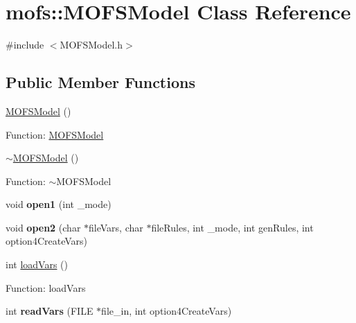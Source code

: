 \hypertarget{classmofs_1_1MOFSModel}{\section{mofs\-:\-:M\-O\-F\-S\-Model Class Reference}
\label{classmofs_1_1MOFSModel}
}


{\ttfamily \#include $<$M\-O\-F\-S\-Model.\-h$>$}

\subsection*{Public Member Functions}
\begin{DoxyCompactItemize}
\item 
\hyperlink{classmofs_1_1MOFSModel_a2bdf10a9c3bb27aa53f979ac5d4dc558}{M\-O\-F\-S\-Model} ()
\begin{DoxyCompactList}\small\item\em 

 Function\-: \hyperlink{classmofs_1_1MOFSModel}{M\-O\-F\-S\-Model} \end{DoxyCompactList}\item 
\hyperlink{classmofs_1_1MOFSModel_a15b048b48e74581f758a88c51e7e1ea6}{$\sim$\-M\-O\-F\-S\-Model} ()
\begin{DoxyCompactList}\small\item\em 

 Function\-: $\sim$\-M\-O\-F\-S\-Model \end{DoxyCompactList}\item 
\hypertarget{classmofs_1_1MOFSModel_a2f2fc649c33a7160c13bf606c9e8ded8}{void {\bfseries open1} (int \-\_\-mode)}\label{classmofs_1_1MOFSModel_a2f2fc649c33a7160c13bf606c9e8ded8}

\item 
\hypertarget{classmofs_1_1MOFSModel_a8c90cb16168e9d4e03317b9c78e7926f}{void {\bfseries open2} (char $\ast$file\-Vars, char $\ast$file\-Rules, int \-\_\-mode, int gen\-Rules, int option4\-Create\-Vars)}\label{classmofs_1_1MOFSModel_a8c90cb16168e9d4e03317b9c78e7926f}

\item 
int \hyperlink{classmofs_1_1MOFSModel_a6cd386125e877d871ab876063faf8713}{load\-Vars} ()
\begin{DoxyCompactList}\small\item\em 

 Function\-: load\-Vars \end{DoxyCompactList}\item 
\hypertarget{classmofs_1_1MOFSModel_a180d059fde3ea5e725becb07185eaf13}{int {\bfseries read\-Vars} (F\-I\-L\-E $\ast$file\-\_\-in, int option4\-Create\-Vars)}\label{classmofs_1_1MOFSModel_a180d059fde3ea5e725becb07185eaf13}


\end{DoxyCompactItemize}
